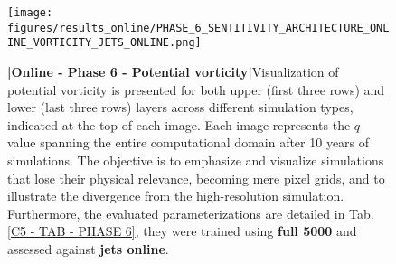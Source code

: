 \begin{figure}[H]
    \centering
    \texttt{[image: figures/results\_online/PHASE\_6\_SENTITIVITY\_ARCHITECTURE\_ONLINE\_VORTICITY\_JETS\_ONLINE.png]}
    \caption{\textbf{|}\textcolor{section_color}{\textbf{Online - Phase 6 - Potential vorticity}}\textbf{|}Visualization of potential vorticity is presented for both upper (first three rows) and lower (last three rows) layers across different simulation types, indicated at the top of each image. Each image represents the $q$ value spanning the entire computational domain after 10 years of simulations. The objective is to emphasize and visualize simulations that lose their physical relevance, becoming mere pixel grids, and to illustrate the divergence from the high-resolution simulation. Furthermore, the evaluated parameterizations are detailed in Tab.\ref{C5 - TAB - PHASE 6}, they were trained using \textbf{full 5000} and assessed against \textbf{jets online}.}
    \label{APP - ONLINE - PHASE 6 - VORTICITY -  FULL 5000 and JETS ONLINE}
\end{figure}
